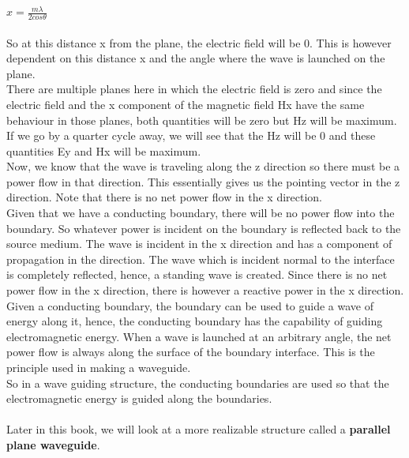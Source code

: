 \\ $x = \frac{m\lambda}{2cos\theta}$ 
\\\\ So at this distance x from the plane, the electric field will be 0. This is however dependent 
on this distance x and the angle where the wave is launched
on the plane.\\ There are multiple
planes here in which the electric field is zero and since the electric field and the x component of the magnetic field
Hx have the same behaviour in those planes, both quantities will be zero
but Hz will be maximum. If we go by a quarter cycle away, we will
see that the Hz will be 0 and these quantities Ey and Hx will be
maximum.
\\ Now, we know that the wave is traveling along the z direction so
there must be a power flow in that direction. This essentially gives us
the pointing vector in the z direction. Note that there is no net power
flow in the x direction.\\ Given that we have a conducting boundary, there will be no power flow into the boundary. So whatever power is incident on the boundary is reflected back to the source medium. The wave is
incident in the x direction and has a component of propagation in the
direction. The wave which is incident normal to the interface is
completely reflected, hence, a standing wave is created. Since there is
no net power flow in the x direction, there is however a reactive
power in the x direction.
Given a conducting boundary, the boundary can be used to guide a
wave of energy along it, hence, the conducting boundary has the
capability of guiding electromagnetic energy. When a wave is launched at an arbitrary angle, the net power flow is always along the
surface of the boundary interface. This is the principle used in making
a waveguide. \\ So in a wave guiding structure, the conducting
boundaries are used so that the electromagnetic energy is guided along the
boundaries.
\\\\ Later in this book, we will look at a more realizable structure called a \textbf{parallel plane waveguide}.